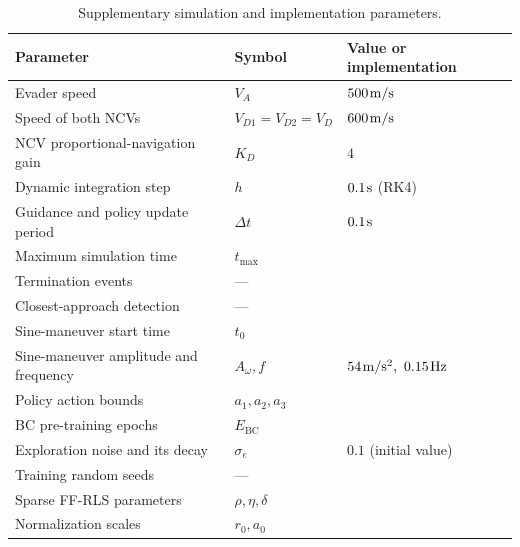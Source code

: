 \begin{table}[H]
\centering
\caption{Supplementary simulation and implementation parameters.}
\label{tab:supp-sim-params}
\small
\begin{tabularx}{\linewidth}{lXX}
\toprule
Parameter & Symbol & Value or implementation \\
\midrule
Evader speed & $V_A$ & $500{\kern 1pt}\mathrm{m/s}$ \\
Speed of both NCVs & $V_{D1}=V_{D2}=V_D$ & $600{\kern 1pt}\mathrm{m/s}$ \\
NCV proportional-navigation gain & $K_D$ & $4$ \\
Dynamic integration step & $h$ & $0.1{\kern 1pt}\mathrm{s}$ (RK4) \\
Guidance and policy update period & $\Delta t$ & $0.1{\kern 1pt}\mathrm{s}$ \\
Maximum simulation time & $t_{\max}$ &  \\ %
Termination events & --- &  \\ %
Closest-approach detection & --- &  \\ %
Sine-maneuver start time & $t_0$ &  \\ %
Sine-maneuver amplitude and frequency & $A_\omega,f$ & $54{\kern 1pt}\mathrm{m/s^2},\ 0.15{\kern 1pt}\mathrm{Hz}$ \\
Policy action bounds & $a_1,a_2,a_3$ &  \\ %
BC pre-training epochs & $E_{\mathrm{BC}}$ &  \\ %
Exploration noise and its decay & $\sigma_e$ & $0.1$ (initial value) \\ %
Training random seeds & --- &  \\ %
Sparse FF-RLS parameters & $\rho,\eta,\delta$ &  \\ %
Normalization scales & $r_0,a_0$ &  \\ %
\bottomrule
\end{tabularx}
\end{table}

